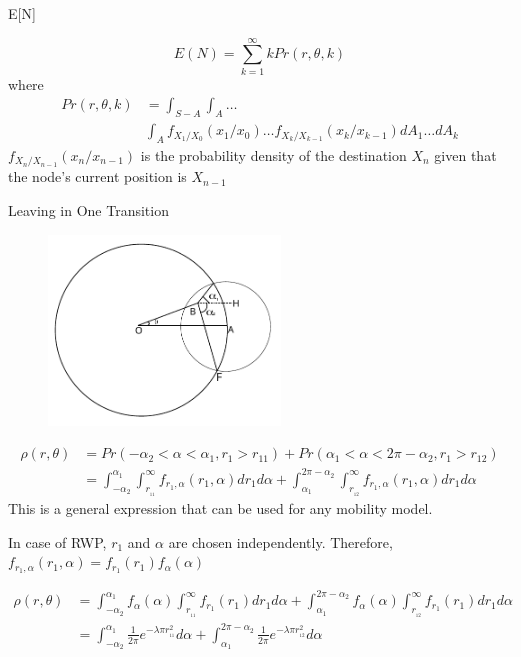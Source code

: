 \documentclass{beamer}
\begin{document}
\begin{frame}{E[N]}{}

\begin{equation*}
	E(N) = \sum_{k=1}^{\infty} k Pr(r,\theta,k)
\end{equation*}
where 
\begin{align*}
	Pr(r,\theta,k) &= \int_{S-A} \int_A \ldots \\ &\int_A f_{X_1/X_0}(x_1/x_0)\ldots f_{X_{k}/X_{k-1}}(x_{k}/x_{k-1}) dA_1 \ldots dA_{k}
\end{align*}  
$f_{X_n/X_{n-1}}(x_n/x_{n-1})$ is the probability density of the destination $X_n$ given that
the node's current position is $X_{n-1}$
\end{frame}



\begin{frame}{Leaving in One Transition}{}
\begin{figure}[h]
	\centering \vspace{-0.1in}
	\includegraphics[width=0.55\textwidth]{images/a1a2.pdf}
\end{figure}
\vspace{-1cm}
\begin{align*}
	\rho(r,\theta) &= Pr(-\alpha_2 < \alpha < \alpha_1,r_1 > r_{11}) + Pr(\alpha_1 < \alpha < 2\pi-\alpha_2, r_1 > r_{12}) \\
	&= \int_{-\alpha_2}^{\alpha_1} \int_{r_{\!_{11}}}^{\infty} f_{r_1,\alpha}(r_1,\alpha)dr_1 d\alpha +  \int^{2\pi-\alpha_2}_{\alpha_1} \int_{r_{\!_{12}}}^{\infty} f_{r_1,\alpha}(r_1,\alpha)dr_1 d\alpha 
\end{align*}
	This is a general expression that can be used for any mobility model. 
\end{frame}
\begin{frame}	
	
	In case of RWP,
	$r_1$ and $\alpha$ are chosen independently. Therefore, 
	$f_{r_1,\alpha}(r_1,\alpha) = f_{r_1}(r_1)f_{\alpha}(\alpha)$ 

\begin{align*}
	\rho(r,\theta)&= \int_{-\alpha_2}^{\alpha_1} f_{\alpha}(\alpha) \int_{r_{\!_{11}}}^{\infty} f_{r_1}(r_1)dr_1 d\alpha +  \int^{2\pi-\alpha_2}_{\alpha_1} f_{\alpha}(\alpha) \int_{r_{\!_{12}}}^{\infty} f_{r_1}(r_1)dr_1 d\alpha  \\
	&= \int_{-\alpha_2}^{\alpha_1} \frac{1}{2\pi} e^{-\lambda \pi r_{\!_{11}}^2} d\alpha +  \int^{2\pi-\alpha_2}_{\alpha_1} \frac{1}{2\pi} e^{-\lambda \pi r_{\!_{12}}^2} d\alpha
\end{align*}
\end{frame}
\end{document}
